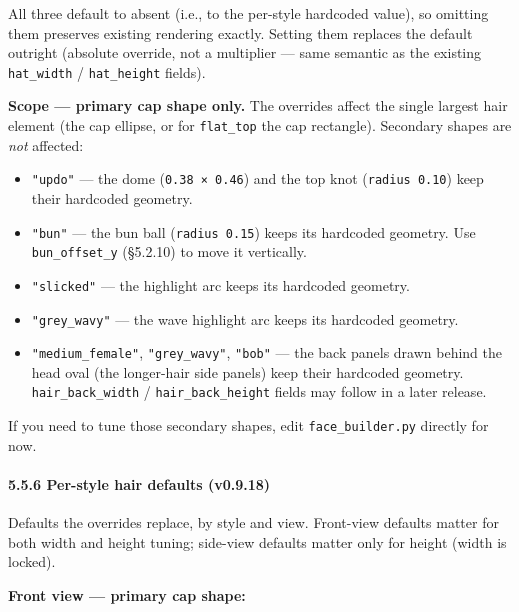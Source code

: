 \documentclass[
  12pt,
  letterpaper,
]{book}
\providecommand{\tightlist}{%
  \setlength{\itemsep}{0pt}\setlength{\parskip}{0pt}}
\begin{document}
All three default to absent (i.e., to the per-style hardcoded value), so
omitting them preserves existing rendering exactly. Setting them
replaces the default outright (absolute override, not a multiplier ---
same semantic as the existing \texttt{hat\_width} / \texttt{hat\_height}
fields).

\textbf{Scope --- primary cap shape only.} The overrides affect the
single largest hair element (the cap ellipse, or for \texttt{flat\_top}
the cap rectangle). Secondary shapes are \emph{not} affected:

\begin{itemize}
\tightlist
\item
  \texttt{"updo"} --- the dome (\texttt{0.38\ ×\ 0.46}) and the top knot
  (\texttt{radius\ 0.10}) keep their hardcoded geometry.
\item
  \texttt{"bun"} --- the bun ball (\texttt{radius\ 0.15}) keeps its
  hardcoded geometry. Use \texttt{bun\_offset\_y} (§5.2.10) to move it
  vertically.
\item
  \texttt{"slicked"} --- the highlight arc keeps its hardcoded geometry.
\item
  \texttt{"grey\_wavy"} --- the wave highlight arc keeps its hardcoded
  geometry.
\item
  \texttt{"medium\_female"}, \texttt{"grey\_wavy"}, \texttt{"bob"} --- the
  back panels drawn behind the head oval (the longer-hair side panels)
  keep their hardcoded geometry. \texttt{hair\_back\_width} /
  \texttt{hair\_back\_height} fields may follow in a later release.
\end{itemize}

If you need to tune those secondary shapes, edit
\texttt{face\_builder.py} directly for now.

\paragraph{\texorpdfstring{5.5.6 Per-style hair defaults
(v0.9.18)}{5.5.6 Per-style hair defaults (v0.9.18)}}\label{per-style-hair-defaults}

Defaults the overrides replace, by style and view. Front-view defaults
matter for both width and height tuning; side-view defaults matter only
for height (width is locked).

\textbf{Front view --- primary cap shape:}
\end{document}
